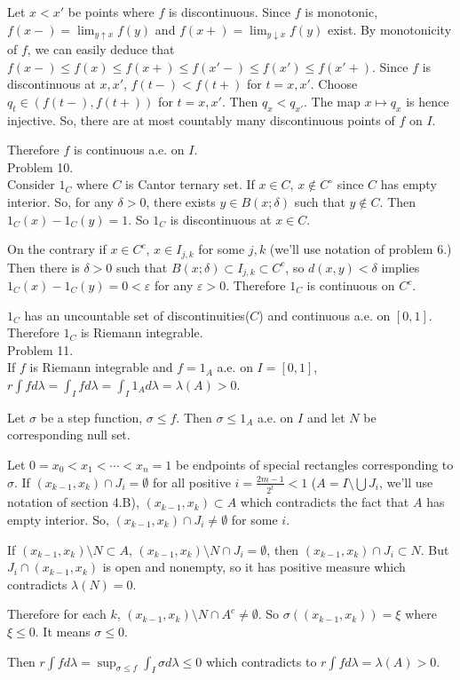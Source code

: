 Let $x< x'$ be points where $f$ is discontinuous.
Since $f$ is monotonic, $f(x-) = \lim_{y\uparrow x}f(y)$ and $f(x+) = \lim_{y\downarrow x}f(y)$ exist.
By monotonicity of $f$, we can easily deduce that $f(x-) \leq f(x) \leq f(x+) \leq f(x'-) \leq f(x') \leq f(x'+)$.
Since $f$ is discontinuous at $x, x'$, $f(t-) < f(t+) $ for $t = x, x'$. Choose $q_t \in (f(t-), f(t+))$ for $t = x, x'$. Then $q_x < q_{x'}$. The map $x \mapsto q_x$ is hence injective. So, there are at most countably many discontinuous points of $f$ on $I$.
	
Therefore $f$ is continuous a.e. on $I$.\\

Problem 10.\\

Consider $1_C$ where $C$ is Cantor ternary set.
If $x \in C$, $x \notin C^\circ$ since $C$ has empty interior. So, for any $\delta >0$, there exists $y \in B(x;\delta)$ such that $y \notin C$. Then $1_C(x) - 1_C(y) = 1$. So $1_C$ is discontinuous at $x \in C$.

On the contrary if $x \in C^c$, $x \in I_{j, k}$ for some $j, k$ (we'll use notation of problem 6.)
Then there is $\delta > 0 $ such that $B(x;\delta) \subset I_{j, k} \subset C^c$, so $d(x, y) < \delta$ implies $1_C(x) - 1_C(y) = 0 < \varepsilon$ for any $\varepsilon >0$. Therefore $1_C$ is continuous on $C^c$.

$1_C$ has an uncountable set of discontinuities($C$) and continuous a.e. on $\left[ 0, 1 \right]$. Therefore $1_C$ is Riemann integrable.\\

Problem 11. \\

If $f$ is Riemann integrable and $f = 1_A$ a.e. on $I = \left[ 0, 1 \right]$, $r\int f d\lambda = \int _I f d\lambda = \int_I 1_A d\lambda = \lambda\left( A \right) > 0$.

Let $\sigma$ be a step function, $\sigma \leq f$. Then $\sigma \leq 1_A$ a.e. on $I$ and let $N$ be corresponding null set.

Let $0 = x_0 < x_1 < \cdots < x_n = 1$ be endpoints of special rectangles corresponding to $\sigma$.
If $\left( x_{k-1}, x_k \right) \cap J_{i} = \emptyset$ for all positive $i = \frac{2m-1}{2^t} < 1$ ($ A = I \setminus \bigcup J_i$, we'll use notation of section 4.B), $\left( x_{k-1}, x_k \right) \subset A$ which contradicts the fact that $A$ has empty interior. So, $\left( x_{k-1}, x_k \right) \cap J_i \ne \emptyset$ for some $i$.

If $\left( x_{k-1}, x_k \right) \setminus N \subset A$, $\left( x_{k-1}, x_k \right) \setminus N \cap J_i = \emptyset$, then $\left( x_{k-1}, x_k \right) \cap J_i \subset N$. But $J_i \cap \left( x_{k-1}, x_k \right)$ is open and nonempty, so it has positive measure which contradicts $\lambda(N) = 0$. 

Therefore for each $k$, $\left( x_{k-1}, x_k \right) \setminus N \cap A^c \ne \emptyset$. So $\sigma\left( \left( x_{k-1}, x_k \right) \right) = {\xi}$ where $\xi \leq 0$. It means $\sigma \leq 0$.

Then $r\int f d\lambda = \sup_{\sigma \leq f} \int_I \sigma d\lambda \leq 0$ which contradicts to $r\int fd\lambda = \lambda\left( A \right) >0$.
